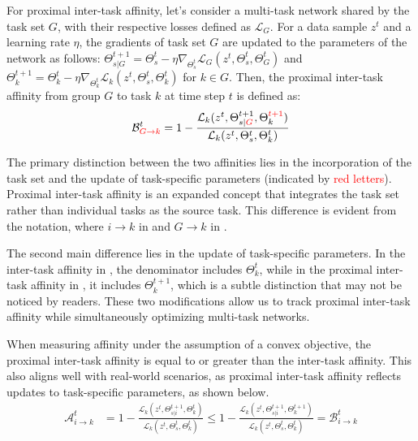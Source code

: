For proximal inter-task affinity, let's consider a multi-task network shared by the task set $G$, with their respective losses defined as $\mathcal{L}_G$. For a data sample $z^t$ and a learning rate $\eta$, the gradients of task set $G$ are updated to the parameters of the network as follows: $\Theta_{s|G}^{t+1} = \Theta_s^t -\eta \nabla_{\Theta_s^t} \mathcal{L}_G (z^t, \Theta_s^t, \Theta_G^t)$ and $\Theta_k^{t+1} = \Theta_k^t -\eta \nabla_{\Theta_k^t} \mathcal{L}_k (z^t, \Theta_s^t, \Theta_k^t)$ for $k \in G$. Then, the proximal inter-task affinity from group $G$ to task $k$ at time step $t$ is defined as:
\begin{align}
    \mathcal{B}^t_{\textcolor{red}{G\rightarrow k}} = 1- \frac{\mathcal{L}_k(z^t, \Theta_{s|\textcolor{red}{G}}^{t+1}, \Theta_k^{\textcolor{red}{t+1}})}{\mathcal{L}_k(z^t, \Theta_{s}^{t}, \Theta_k^t)}
    \label{append:definition:proximal_inter_task_affinity}
\end{align}

The primary distinction between the two affinities lies in the incorporation of the task set and the update of task-specific parameters (indicated by \textcolor{red}{red letters}). Proximal inter-task affinity is an expanded concept that integrates the task set rather than individual tasks as the source task. This difference is evident from the notation, where $i \rightarrow k$ in  and $G \rightarrow k$ in .

The second main difference lies in the update of task-specific parameters. In the inter-task affinity in , the denominator includes $\Theta_k^t$, while in the proximal inter-task affinity in , it includes $\Theta_k^{t+1}$, which is a subtle distinction that may not be noticed by readers.
These two modifications allow us to track proximal inter-task affinity while simultaneously optimizing multi-task networks.

When measuring affinity under the assumption of a convex objective, the proximal inter-task affinity is equal to or greater than the inter-task affinity. This also aligns well with real-world scenarios, as proximal inter-task affinity reflects updates to task-specific parameters, as shown below.
\begin{align}
    \mathcal{A}^t_{i\rightarrow k} &= 1- \frac{\mathcal{L}_k(z^t, \Theta_{s|i}^{t+1}, \Theta_k^t)}{\mathcal{L}_k(z^t, \Theta_{s}^{t}, \Theta_k^t)} \leq 1- \frac{\mathcal{L}_k(z^t, \Theta_{s|i}^{t+1}, \Theta_k^{t+1})}{\mathcal{L}_k(z^t, \Theta_{s}^{t}, \Theta_k^t)} = \mathcal{B}^t_{i\rightarrow k}
\end{align}

